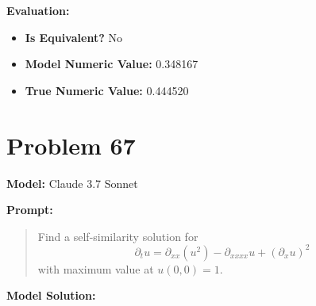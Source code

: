 \documentclass{article}
\begin{document}
\textbf{Evaluation:}
\begin{itemize}
\item \textbf{Is Equivalent?} No
\item \textbf{Model Numeric Value:} 0.348167
\item \textbf{True Numeric Value:} 0.444520
\end{itemize}
\vspace{1cm}
\section*{Problem 67}
\textbf{Model:} Claude 3.7 Sonnet

\textbf{Prompt:}
\begin{quote}
Find a self-similarity solution for $$ \partial_t u = \partial_{xx}(u^2) - \partial_{xxxx}u + (\partial_x u)^2 $$ with maximum value at $u(0,0) = 1$.
\end{quote}
\textbf{Model Solution:}
\end{document}
